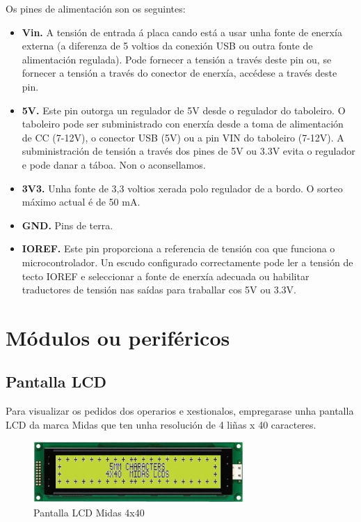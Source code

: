 \documentclass[11pt,twoside]{book}
\begin{document}
Os pines de alimentación son os seguintes:

\begin{itemize}
\item \textbf{Vin.} A tensión de entrada á placa cando está a usar unha fonte de enerxía externa (a diferenza de 5 voltios da conexión USB ou outra fonte de alimentación regulada). Pode fornecer a tensión a través deste pin ou, se fornecer a tensión a través do conector de enerxía, accédese a través deste pin.
\item \textbf{5V.} Este pin outorga un regulador de 5V desde o regulador do taboleiro. O taboleiro pode ser subministrado con enerxía desde a toma de alimentación de CC (7-12V), o conector USB (5V) ou a pin VIN do taboleiro (7-12V). A subministración de tensión a través dos pines de 5V ou 3.3V evita o regulador e pode danar a táboa. Non o aconsellamos.
\item \textbf{3V3.} Unha fonte de 3,3 voltios xerada polo regulador de a bordo. O sorteo máximo actual é de 50 mA.
\item \textbf{GND.} Pins de terra.
\item \textbf{IOREF.} Este pin proporciona a referencia de tensión coa que funciona o microcontrolador. Un escudo configurado correctamente pode ler a tensión de tecto IOREF e seleccionar a fonte de enerxía adecuada ou habilitar traductores de tensión nas saídas para traballar cos 5V ou 3.3V.
\end{itemize}

\section{Módulos ou periféricos}

\subsection{Pantalla LCD}

Para visualizar os pedidos dos operarios e xestionalos, empregarase unha pantalla LCD da marca Midas que ten unha resolución de 4 liñas x 40 caracteres. 

\begin{figure}[H]
	\begin{center}
		\includegraphics[width=8cm]{images/lcd.jpg}
	\end{center}
	\caption{Pantalla LCD Midas 4x40}
	\label{fig:PantallaLCD}
\end{figure}
\end{document}
